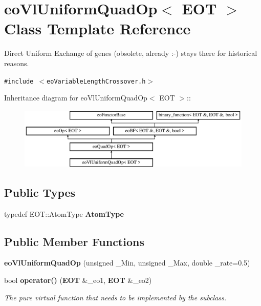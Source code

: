\section{eo\-Vl\-Uniform\-Quad\-Op$<$ EOT $>$ Class Template Reference}
\label{classeo_vl_uniform_quad_op}
Direct Uniform Exchange of genes (obsolete, already :-) stays there for historical reasons.  


{\tt \#include $<$eo\-Variable\-Length\-Crossover.h$>$}

Inheritance diagram for eo\-Vl\-Uniform\-Quad\-Op$<$ EOT $>$::\begin{figure}[H]
\begin{center}
\leavevmode
\includegraphics[height=2.96296cm]{classeo_vl_uniform_quad_op}
\end{center}
\end{figure}
\subsection*{Public Types}
\begin{CompactItemize}
\item 
typedef EOT::Atom\-Type {\bf Atom\-Type}\label{classeo_vl_uniform_quad_op_w0}

\end{CompactItemize}
\subsection*{Public Member Functions}
\begin{CompactItemize}
\item 
{\bf eo\-Vl\-Uniform\-Quad\-Op} (unsigned \_\-Min, unsigned \_\-Max, double \_\-rate=0.5)\label{classeo_vl_uniform_quad_op_a0}

\item 
bool {\bf operator()} ({\bf EOT} \&\_\-eo1, {\bf EOT} \&\_\-eo2)\label{classeo_vl_uniform_quad_op_a1}

\begin{CompactList}\small\item\em The pure virtual function that needs to be implemented by the subclass. \item\end{CompactList}\end{CompactItemize}
